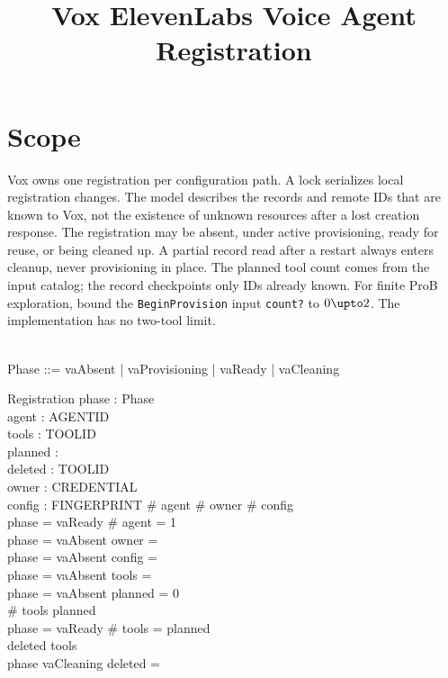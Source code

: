 \documentclass[a4paper,10pt,fleqn]{article}
\begin{document}
\title{Vox ElevenLabs Voice Agent Registration}
\maketitle

\section{Scope}

Vox owns one registration per configuration path. A lock serializes local
registration changes. The model describes the records and remote IDs that
are known to Vox, not the existence of unknown resources after a lost
creation response. The registration may be absent, under active provisioning,
ready for reuse, or being cleaned up. A partial record read after a restart
always enters cleanup, never provisioning in place. The planned tool count
comes from the input catalog; the record checkpoints only IDs already known.
For finite ProB exploration, bound the \texttt{BeginProvision} input
\texttt{count?} to \(0 \upto 2\). The implementation has no two-tool limit.

\begin{zed}
   \\
  Phase ::= vaAbsent | vaProvisioning | vaReady | vaCleaning
\end{zed}

\begin{schema}{Registration}
  phase : Phase \\
  agent : \finset AGENTID \\
  tools : \seq TOOLID \\
  planned : \nat \\
  deleted : \power TOOLID \\
  owner : \finset CREDENTIAL \\
  config : \finset FINGERPRINT
\where
  \# agent  \land \# owner  \land \# config  \\
  phase = vaReady \iff \# agent = 1 \\
  phase = vaAbsent \iff owner = \emptyset \\
  phase = vaAbsent \iff config = \emptyset \\
  phase = vaAbsent \implies tools = \langle \rangle \\
  phase = vaAbsent \implies planned = 0 \\
  \# tools \leq planned \\
  phase = vaReady \implies \# tools = planned \\
  deleted \subseteq \ran tools \\
  phase \neq vaCleaning \implies deleted = \emptyset
\end{schema}
\end{document}
